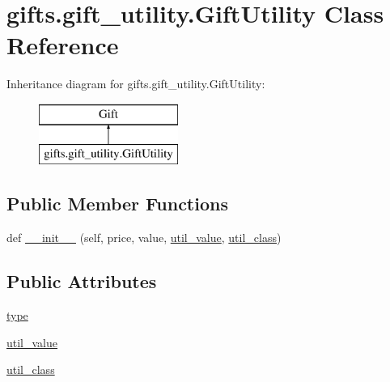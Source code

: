 \hypertarget{classgifts_1_1gift__utility_1_1_gift_utility}{}\section{gifts.\+gift\+\_\+utility.\+Gift\+Utility Class Reference}
\label{classgifts_1_1gift__utility_1_1_gift_utility}
Inheritance diagram for gifts.\+gift\+\_\+utility.\+Gift\+Utility\+:\begin{figure}[H]
\begin{center}
\leavevmode
\includegraphics[height=2.000000cm]{classgifts_1_1gift__utility_1_1_gift_utility}
\end{center}
\end{figure}
\subsection*{Public Member Functions}
\begin{DoxyCompactItemize}
\item 
def \hyperlink{classgifts_1_1gift__utility_1_1_gift_utility_a39092f6772d89d3b8d1efeee86ffa507}{\+\_\+\+\_\+init\+\_\+\+\_\+} (self, price, value, \hyperlink{classgifts_1_1gift__utility_1_1_gift_utility_a1094dc899092b5ba3016185e06b45fc3}{util\+\_\+value}, \hyperlink{classgifts_1_1gift__utility_1_1_gift_utility_a24c52333a19b3fd3f12e35d4ffc23995}{util\+\_\+class})
\end{DoxyCompactItemize}
\subsection*{Public Attributes}
\begin{DoxyCompactItemize}
\item 
\hyperlink{classgifts_1_1gift__utility_1_1_gift_utility_af9b9177cd8cb081752b83241a863368c}{type}
\item 
\hyperlink{classgifts_1_1gift__utility_1_1_gift_utility_a1094dc899092b5ba3016185e06b45fc3}{util\+\_\+value}
\item 
\hyperlink{classgifts_1_1gift__utility_1_1_gift_utility_a24c52333a19b3fd3f12e35d4ffc23995}{util\+\_\+class}
\end{DoxyCompactItemize}


